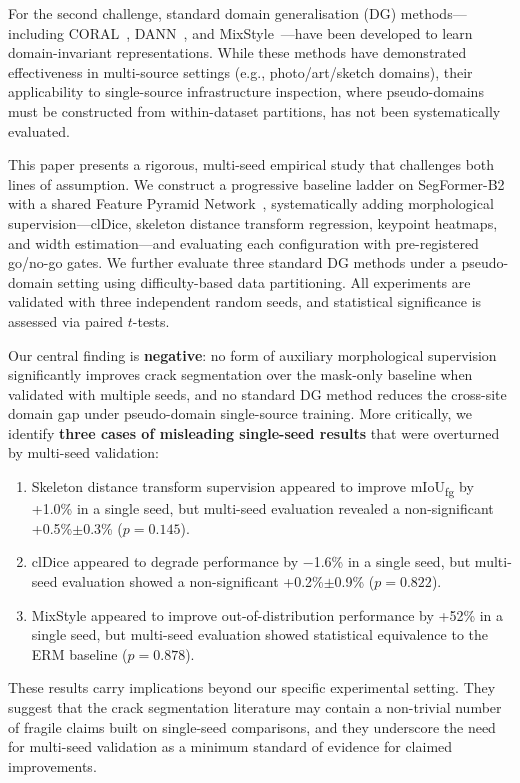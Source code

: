 \documentclass[preprint,12pt]{elsarticle}
\begin{document}
For the second challenge, standard domain generalisation (DG) methods---including CORAL~\cite{sun2016coral}, DANN~\cite{ganin2016dann}, and MixStyle~\cite{zhou2021mixstyle}---have been developed to learn domain-invariant representations. While these methods have demonstrated effectiveness in multi-source settings (e.g., photo/art/sketch domains), their applicability to single-source infrastructure inspection, where pseudo-domains must be constructed from within-dataset partitions, has not been systematically evaluated.

This paper presents a rigorous, multi-seed empirical study that challenges both lines of assumption. We construct a progressive baseline ladder on SegFormer-B2~\cite{xie2021segformer} with a shared Feature Pyramid Network~\cite{lin2017fpn}, systematically adding morphological supervision---clDice, skeleton distance transform regression, keypoint heatmaps, and width estimation---and evaluating each configuration with pre-registered go/no-go gates. We further evaluate three standard DG methods under a pseudo-domain setting using difficulty-based data partitioning. All experiments are validated with three independent random seeds, and statistical significance is assessed via paired $t$-tests.

Our central finding is \textbf{negative}: no form of auxiliary morphological supervision significantly improves crack segmentation over the mask-only baseline when validated with multiple seeds, and no standard DG method reduces the cross-site domain gap under pseudo-domain single-source training. More critically, we identify \textbf{three cases of misleading single-seed results} that were overturned by multi-seed validation:
\begin{enumerate}
    \item Skeleton distance transform supervision appeared to improve mIoU\textsubscript{fg} by +1.0\% in a single seed, but multi-seed evaluation revealed a non-significant +0.5\%$\pm$0.3\% ($p=0.145$).
    \item clDice appeared to degrade performance by $-$1.6\% in a single seed, but multi-seed evaluation showed a non-significant +0.2\%$\pm$0.9\% ($p=0.822$).
    \item MixStyle appeared to improve out-of-distribution performance by +52\% in a single seed, but multi-seed evaluation showed statistical equivalence to the ERM baseline ($p=0.878$).
\end{enumerate}

These results carry implications beyond our specific experimental setting. They suggest that the crack segmentation literature may contain a non-trivial number of fragile claims built on single-seed comparisons, and they underscore the need for multi-seed validation as a minimum standard of evidence for claimed improvements.
\end{document}
